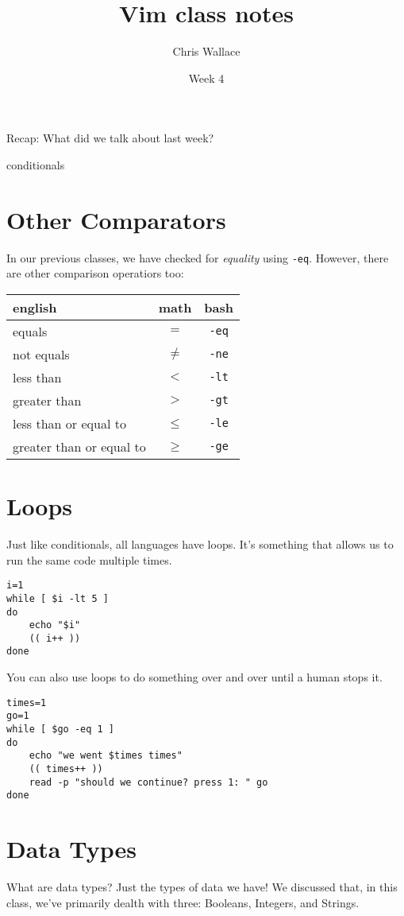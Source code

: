 \documentclass{article}
\title{Vim class notes}
\author{Chris Wallace}
\date{Week 4}
\begin{document}
\maketitle

\noindent Recap: What did we talk about last week?
\begin{compactitem}
    \item conditionals
\end{compactitem}

\section*{Other Comparators}
In our previous classes, we have checked for \textit{equality} using
\texttt{-eq}. However, there are other comparison operatiors too:

\begin{center}
    \begin{tabular}{l|c|c}
        \textbf{english} & \textbf{math} & \textbf{bash} \\ \hline
        equals & $=$ & \texttt{-eq} \\
        not equals & $\neq$ & \texttt{-ne} \\
        less than & $<$ & \texttt{-lt} \\
        greater than & $>$ & \texttt{-gt} \\
        less than or equal to& $\le$ & \texttt{-le} \\
        greater than or equal to& $\ge$ & \texttt{-ge}
    \end{tabular}
\end{center}

\section*{Loops}
Just like conditionals, all languages have loops. It's something that allows us
to run the same code multiple times.
\begin{lstlisting}
i=1
while [ $i -lt 5 ]
do
    echo "$i"
    (( i++ ))
done
\end{lstlisting}

You can also use loops to do something over and over until a human stops it.
\begin{lstlisting}
times=1
go=1
while [ $go -eq 1 ]
do
    echo "we went $times times"
    (( times++ ))
    read -p "should we continue? press 1: " go
done
\end{lstlisting}

\section*{Data Types}
What are data types? Just the types of data we have! We discussed that, in this
class, we've primarily dealth with three: Booleans, Integers, and Strings.
\end{document}
